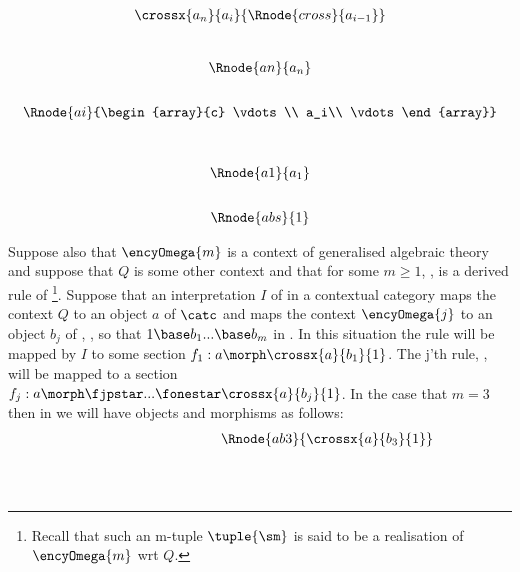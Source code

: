 \begin{tightquote}
\begin{oldtt}
\begin{displaymath}
\begin{array}{c}
\crossx{a_n}{a_i}{\Rnode{cross}{a_{i-1}}} \\[0.9cm]
\Rnode{an}{a_n}\\[0.7cm]
\Rnode{ai}{\begin{array}{c}
\vdots\\
a_i\\
\vdots
\end{array}} \\[1.1cm]
\Rnode{a1}{a_1}\\[0.7cm]
\Rnode{abs}{1}
\end{array}
\end{displaymath}
\end{oldtt}
\begin{oldtt}
\label{omegarealisationwrtQ}
 Suppose also that $\encyOmega{m}$ is a context of generalised algebraic theory \gatUw and suppose that $Q$ is some other context and that for some $m \geq 1$,
 \foreachj,  is a derived rule of \gatU\footnote{Recall that such an m-tuple $\tuple{\sm}$ is said to be a realisation of 
$\encyOmega{m}$ wrt $Q$.}.  Suppose that an interpretation $I$ of \gatUw in a contextual category \catcw maps the context $Q$ to an object $a$  of $\catc$ and maps
the context $\encyOmega{j}$ to an object $b_j$ of \catc, \foreachj, so that $1 \base b_1 ... \base b_m$ in \catc. In this situation the rule 
 will be mapped by $I$ to some section $f_1:a \morph \crossx{a}{b_1}{1}$. The j'th rule,
, will be mapped to a section $f_j:a \morph \fjpstar ... \fonestar\crossx{a}{b_j}{1}$.
In the case that $m=3$  then in \catcw we will have objects and morphisms as follows:
\begin{displaymath}
\begin{array}{c p{1cm} c p {1cm} c  p{1cm} c}
                                                &&                                           && \Rnode{ab3}{\crossx{a}{b_3}{1}}                       \\[1.2cm]

\end{array}
\end{displaymath}
\end{oldtt}
\end{tightquote}

